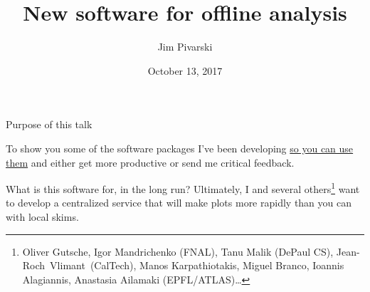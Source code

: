 \documentclass[aspectratio=169]{beamer}
\title[2017-10-13-lpc-testdrive]{New software for offline analysis}
\author{Jim Pivarski}
\institute{Princeton University -- DIANA}
\date{October 13, 2017}
\begin{document}

\begin{frame}
  \titlepage
\end{frame}




\begin{frame}{Purpose of this talk}
\vspace{0.15 cm}
\begin{center}
\large To show you some of the software packages I've been developing \underline{so you can use them} and either get more productive or send me critical feedback.

\vspace{1 cm}
\end{center}
\end{frame}

\begin{frame}{What is this software for, in the long run?}
\vspace{0.15 cm}
\large Ultimately, I and several others\footnote{Oliver Gutsche, Igor Mandrichenko (FNAL), Tanu Malik (DePaul CS), \mbox{Jean-Roch Vlimant (CalTech),\hspace{-1 cm}} Manos Karpathiotakis, Miguel Branco, Ioannis Alagiannis, Anastasia Ailamaki (EPFL/ATLAS)\ldots} want to develop a centralized service that will make plots more rapidly than you can with local skims.

\vspace{0.5 cm}

\vspace{0.5 cm}

\vspace{0.5 cm}
\end{frame}
\end{document}
